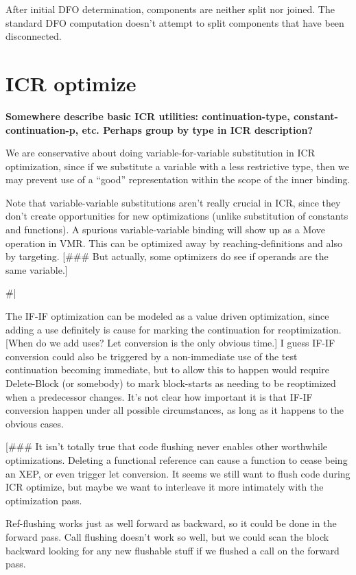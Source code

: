 After initial DFO determination, components are neither split nor joined.  The
standard DFO computation doesn't attempt to split components that have been
disconnected.

\chapter{ICR optimize}

{\bf Somewhere describe basic ICR utilities: continuation-type,
constant-continuation-p, etc.  Perhaps group by type in ICR description?}

We are conservative about doing variable-for-variable substitution in ICR
optimization, since if we substitute a variable with a less restrictive type,
then we may prevent use of a ``good'' representation within the scope of the
inner binding.

Note that variable-variable substitutions aren't really crucial in ICR, since
they don't create opportunities for new optimizations (unlike substitution of
constants and functions).  A spurious variable-variable binding will show up as
a Move operation in VMR.  This can be optimized away by reaching-definitions
and also by targeting.  [\#\#\# But actually, some optimizers do see if operands
are the same variable.]

\#|

The IF-IF optimization can be modeled as a value driven optimization, since
adding a use definitely is cause for marking the continuation for
reoptimization.  [When do we add uses?  Let conversion is the only obvious
time.]  I guess IF-IF conversion could also be triggered by a non-immediate use
of the test continuation becoming immediate, but to allow this to happen would
require Delete-Block (or somebody) to mark block-starts as needing to be
reoptimized when a predecessor changes.  It's not clear how important it is
that IF-IF conversion happen under all possible circumstances, as long as it
happens to the obvious cases.

[\#\#\# It isn't totally true that code flushing never enables other worthwhile
optimizations.  Deleting a functional reference can cause a function to cease
being an XEP, or even trigger let conversion.  It seems we still want to flush
code during ICR optimize, but maybe we want to interleave it more intimately
with the optimization pass.  

Ref-flushing works just as well forward as backward, so it could be done in the
forward pass.  Call flushing doesn't work so well, but we could scan the block
backward looking for any new flushable stuff if we flushed a call on the
forward pass.

